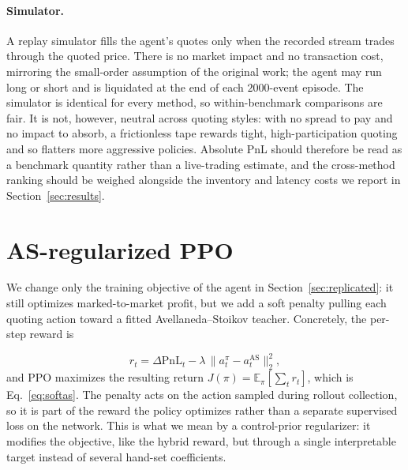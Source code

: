 \documentclass{article}
\newcommand{\E}{\mathbb{E}}
\begin{document}
\paragraph{Simulator.} A replay simulator fills the agent's quotes
only when the recorded stream trades through the quoted price. There
is no market impact and no transaction cost, mirroring the small-order assumption of the original work; the agent may run long or short and is liquidated at the end of each $2000$-event episode. The simulator is identical for every method, so within-benchmark comparisons are fair. It is not, however, neutral across quoting styles: with no spread to pay and no impact to absorb, a frictionless tape rewards tight, high-participation quoting and so flatters more aggressive policies. Absolute PnL should therefore be read as a benchmark quantity rather than a live-trading estimate, and the cross-method ranking should be weighed alongside the inventory and latency costs we report in Section~\ref{sec:results}.

\section{AS-regularized PPO}
\label{sec:method}

We change only the training objective of the agent in Section~\ref{sec:replicated}: it still optimizes marked-to-market profit, but we add a soft penalty pulling each quoting action toward a fitted Avellaneda--Stoikov teacher. Concretely, the per-step reward is

\begin{equation}
r_t = \Delta\mathrm{PnL}_t - \lambda\,\bigl\lVert a^\pi_t - a^{\mathrm{AS}}_t \bigr\rVert_2^2 ,
\label{eq:stepreward}
\end{equation}
and PPO maximizes the resulting return $J(\pi)=\E_\pi[\sum_t r_t]$, which is Eq.~\eqref{eq:softas}. The penalty acts on the action sampled during rollout collection, so it is part of the reward the policy optimizes rather than a separate supervised loss on the network. This is what we mean by a control-prior regularizer: it modifies the objective, like the hybrid reward, but through a single interpretable target instead of several hand-set coefficients.
\end{document}
